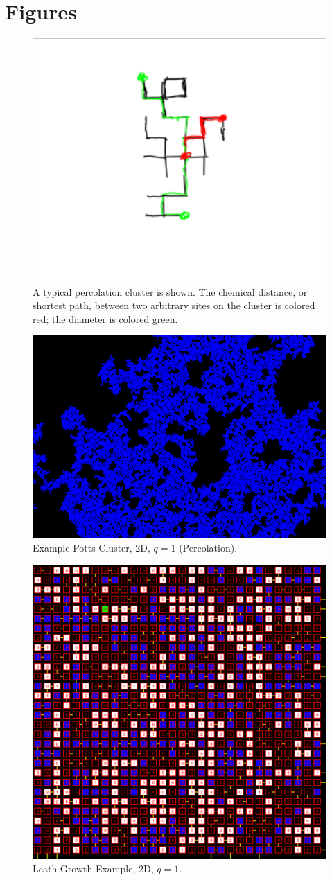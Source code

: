\documentclass[pre,preprint,11pt]{revtex4}
\begin{document}
\section{Figures}


\begin{figure}[htp]
\centering
\includegraphics[width=.55\textwidth]{figures/definitions}
\caption{A typical percolation cluster is shown.  The chemical distance, or shortest path, between two arbitrary sites on the cluster is colored red; the diameter is colored green.}\label{fig:definitions}
\end{figure}

\begin{figure}[htp]
\centering
\includegraphics[width=.55\textwidth]{figures/pottscluster}
\caption{Example Potts Cluster, 2D, $q=1$ (Percolation).}
\end{figure}

\begin{figure}[htp]
\centering
\includegraphics[width=.35\textwidth]{figures/q3potts}
\caption{Leath Growth Example, 2D, $q=1$.}
\end{figure}
\end{document}
